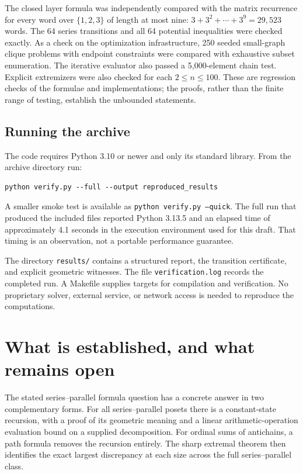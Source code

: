 \documentclass[11pt]{article}
\theoremstyle{definition}
\begin{document}
The closed layer formula was independently compared with the matrix recurrence for every word over $\{1,2,3\}$ of length at most nine: $3+3^2+\cdots+3^9=29,523$ words. The 64 series transitions and all 64 potential inequalities were checked exactly. As a check on the optimization infrastructure, 250 seeded small-graph clique problems with endpoint constraints were compared with exhaustive subset enumeration. The iterative evaluator also passed a 5,000-element chain test. Explicit extremizers were also checked for each $2\le n\le100$. These are regression checks of the formulae and implementations; the proofs, rather than the finite range of testing, establish the unbounded statements.

\subsection{Running the archive}
The code requires Python 3.10 or newer and only its standard library. From the archive directory run:
\begin{lstlisting}
python verify.py --full --output reproduced_results
\end{lstlisting}
A smaller smoke test is available as \texttt{python verify.py --quick}. The full run that produced the included files reported Python 3.13.5 and an elapsed time of approximately 4.1 seconds in the execution environment used for this draft. That timing is an observation, not a portable performance guarantee.

The directory \texttt{results/} contains a structured report, the transition certificate, and explicit geometric witnesses. The file \texttt{verification.log} records the completed run. A Makefile supplies targets for compilation and verification. No proprietary solver, external service, or network access is needed to reproduce the computations.

\section{What is established, and what remains open}\label{sec:limits}

The stated series--parallel formula question has a concrete answer in two complementary forms. For all series--parallel posets there is a constant-state recursion, with a proof of its geometric meaning and a linear arithmetic-operation evaluation bound on a supplied decomposition. For ordinal sums of antichains, a path formula removes the recursion entirely. The sharp extremal theorem then identifies the exact largest discrepancy at each size across the full series--parallel class.
\end{document}
